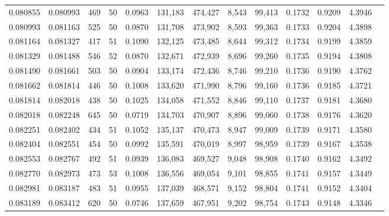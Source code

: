 \begin{tabular}{rrrrrrrrrrrrr}
0.080855 & 0.080993 &   469 &  50 &                                     0.0963 & 131,183 & 474,427 &   8,543 &  99,413 & 0.1732 & 0.9209 & 4.3946 \\
0.080993 & 0.081163 &   525 &  50 &                                     0.0870 & 131,708 & 473,902 &   8,593 &  99,363 & 0.1733 & 0.9204 & 4.3898 \\
0.081164 & 0.081327 &   417 &  51 &                                     0.1090 & 132,125 & 473,485 &   8,644 &  99,312 & 0.1734 & 0.9199 & 4.3859 \\
0.081329 & 0.081488 &   546 &  52 &                                     0.0870 & 132,671 & 472,939 &   8,696 &  99,260 & 0.1735 & 0.9194 & 4.3808 \\
0.081490 & 0.081661 &   503 &  50 &                                     0.0904 & 133,174 & 472,436 &   8,746 &  99,210 & 0.1736 & 0.9190 & 4.3762 \\
0.081662 & 0.081814 &   446 &  50 &                                     0.1008 & 133,620 & 471,990 &   8,796 &  99,160 & 0.1736 & 0.9185 & 4.3721 \\
0.081814 & 0.082018 &   438 &  50 &                                     0.1025 & 134,058 & 471,552 &   8,846 &  99,110 & 0.1737 & 0.9181 & 4.3680 \\
0.082018 & 0.082248 &   645 &  50 &                                     0.0719 & 134,703 & 470,907 &   8,896 &  99,060 & 0.1738 & 0.9176 & 4.3620 \\
0.082251 & 0.082402 &   434 &  51 &                                     0.1052 & 135,137 & 470,473 &   8,947 &  99,009 & 0.1739 & 0.9171 & 4.3580 \\
0.082404 & 0.082551 &   454 &  50 &                                     0.0992 & 135,591 & 470,019 &   8,997 &  98,959 & 0.1739 & 0.9167 & 4.3538 \\
0.082553 & 0.082767 &   492 &  51 &                                     0.0939 & 136,083 & 469,527 &   9,048 &  98,908 & 0.1740 & 0.9162 & 4.3492 \\
0.082770 & 0.082973 &   473 &  53 &                                     0.1008 & 136,556 & 469,054 &   9,101 &  98,855 & 0.1741 & 0.9157 & 4.3449 \\
0.082981 & 0.083187 &   483 &  51 &                                     0.0955 & 137,039 & 468,571 &   9,152 &  98,804 & 0.1741 & 0.9152 & 4.3404 \\
0.083189 & 0.083412 &   620 &  50 &                                     0.0746 & 137,659 & 467,951 &   9,202 &  98,754 & 0.1743 & 0.9148 & 4.3346 \\

\end{tabular}
